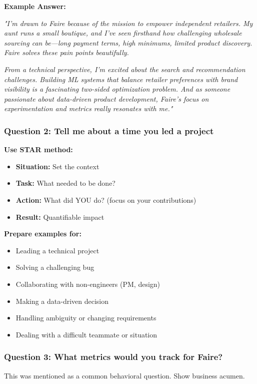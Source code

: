 \documentclass[11pt,letterpaper]{article}
\begin{document}
\textbf{Example Answer:}

\textit{"I'm drawn to Faire because of the mission to empower independent retailers. My aunt runs a small boutique, and I've seen firsthand how challenging wholesale sourcing can be—long payment terms, high minimums, limited product discovery. Faire solves these pain points beautifully.}

\textit{From a technical perspective, I'm excited about the search and recommendation challenges. Building ML systems that balance retailer preferences with brand visibility is a fascinating two-sided optimization problem. And as someone passionate about data-driven product development, Faire's focus on experimentation and metrics really resonates with me."}

\subsubsection{Question 2: Tell me about a time you led a project}

\textbf{Use STAR method:}
\begin{itemize}
    \item \textbf{Situation:} Set the context
    \item \textbf{Task:} What needed to be done?
    \item \textbf{Action:} What did YOU do? (focus on your contributions)
    \item \textbf{Result:} Quantifiable impact
\end{itemize}

\textbf{Prepare examples for:}
\begin{itemize}
    \item Leading a technical project
    \item Solving a challenging bug
    \item Collaborating with non-engineers (PM, design)
    \item Making a data-driven decision
    \item Handling ambiguity or changing requirements
    \item Dealing with a difficult teammate or situation
\end{itemize}

\subsubsection{Question 3: What metrics would you track for Faire?}

This was mentioned as a common behavioral question. Show business acumen.
\end{document}
